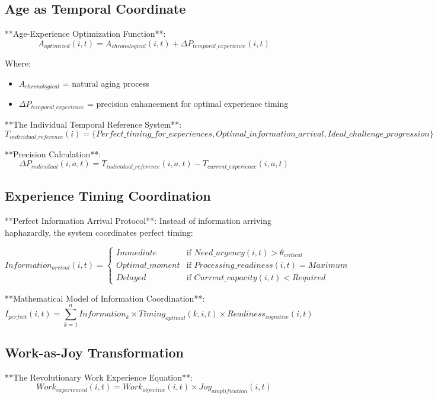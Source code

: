 \documentclass[12pt,a4paper]{article}
\begin{document}
\subsection{Age as Temporal Coordinate}

**Age-Experience Optimization Function**:
$$A_{optimized}(i,t) = A_{chronological}(i,t) + \Delta P_{temporal\_experience}(i,t)$$

Where:
\begin{itemize}
\item $A_{chronological}$ = natural aging process
\item $\Delta P_{temporal\_experience}$ = precision enhancement for optimal experience timing
\end{itemize}

**The Individual Temporal Reference System**:
$$T_{individual\_reference}(i) = \{Perfect\_timing\_for\_experiences, Optimal\_information\_arrival, Ideal\_challenge\_progression\}$$

**Precision Calculation**:
$$\Delta P_{individual}(i,a,t) = T_{individual\_reference}(i,a,t) - T_{current\_experience}(i,a,t)$$

\subsection{Experience Timing Coordination}

**Perfect Information Arrival Protocol**:
Instead of information arriving haphazardly, the system coordinates perfect timing:

$$Information_{arrival}(i,t) = \begin{cases}
Immediate & \text{if } Need\_urgency(i,t) > \theta_{critical} \\
Optimal\_moment & \text{if } Processing\_readiness(i,t) = Maximum \\
Delayed & \text{if } Current\_capacity(i,t) < Required
\end{cases}$$

**Mathematical Model of Information Coordination**:
$$I_{perfect}(i,t) = \sum_{k=1}^{n} Information_k \times Timing_{optimal}(k,i,t) \times Readiness_{cognitive}(i,t)$$

\subsection{Work-as-Joy Transformation}

**The Revolutionary Work Experience Equation**:
$$Work_{experienced}(i,t) = Work_{objective}(i,t) \times Joy_{amplification}(i,t)$$
\end{document}
